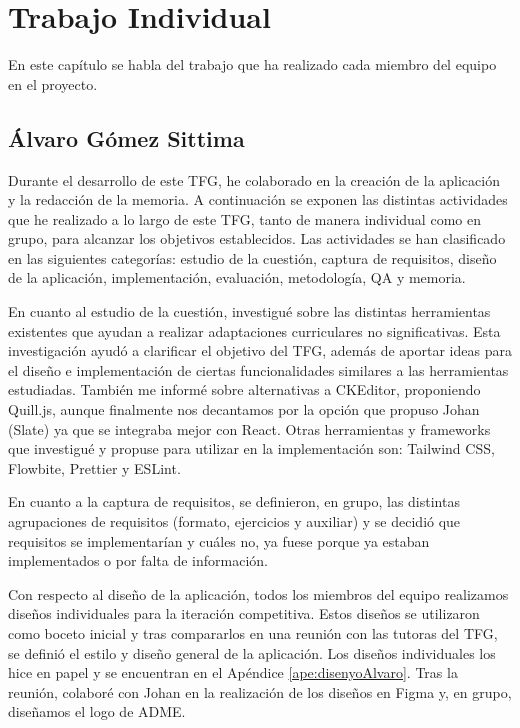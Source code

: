 \chapter{Trabajo Individual}
\label{cap:TrabajoIndividual}

En este capítulo se habla del trabajo que ha realizado cada miembro del equipo en el proyecto.

\section{Álvaro Gómez Sittima}
Durante el desarrollo de este TFG, he colaborado en la creación de la aplicación y la redacción de la memoria. A continuación se exponen las distintas actividades que he realizado a lo largo de este TFG, tanto de manera individual como en grupo, para alcanzar los objetivos establecidos. Las actividades se han clasificado en las siguientes categorías: estudio de la cuestión, captura de requisitos, diseño de la aplicación, implementación, evaluación, metodología, QA y memoria.

En cuanto al estudio de la cuestión, investigué sobre las distintas herramientas existentes que ayudan a realizar adaptaciones curriculares no significativas. Esta investigación ayudó a clarificar el objetivo del TFG, además de aportar ideas para el diseño e implementación de ciertas funcionalidades similares a las herramientas estudiadas. También me informé sobre alternativas a CKEditor, proponiendo Quill.js, aunque finalmente nos decantamos por la opción que propuso Johan (Slate) ya que se integraba mejor con React. Otras herramientas y frameworks que investigué y propuse para utilizar en la implementación son: Tailwind CSS, Flowbite, Prettier y ESLint.

En cuanto a la captura de requisitos, se definieron, en grupo, las distintas agrupaciones de requisitos (formato, ejercicios y auxiliar) y se decidió que requisitos se implementarían y cuáles no, ya fuese porque ya estaban implementados o por falta de información.

Con respecto al diseño de la aplicación, todos los miembros del equipo realizamos diseños individuales para la iteración competitiva. Estos diseños se utilizaron como boceto inicial y tras compararlos en una reunión con las tutoras del TFG, se definió el estilo y diseño general de la aplicación. Los diseños individuales los hice en papel y se encuentran en el Apéndice \ref{ape:disenyoAlvaro}. Tras la reunión, colaboré con Johan en la realización de los diseños en Figma y, en grupo, diseñamos el logo de ADME.


